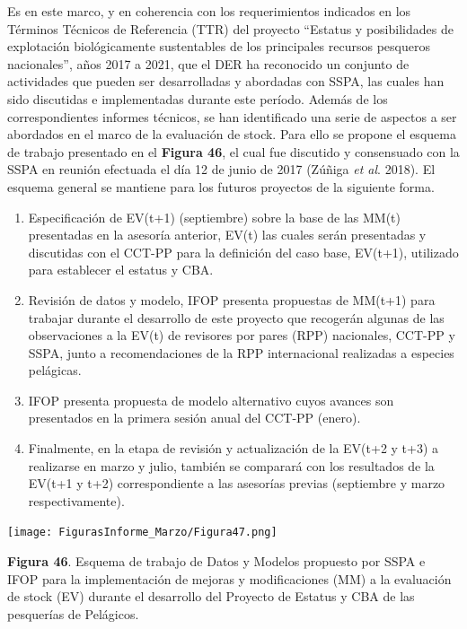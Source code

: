 \documentclass[
  spanish,
]{article}
\providecommand{\tightlist}{%
  \setlength{\itemsep}{0pt}\setlength{\parskip}{0pt}}
\begin{document}
Es en este marco, y en coherencia con los requerimientos indicados en
los Términos Técnicos de Referencia (TTR) del proyecto ``Estatus y
posibilidades de explotación biológicamente sustentables de los
principales recursos pesqueros nacionales'', años 2017 a 2021, que el
DER ha reconocido un conjunto de actividades que pueden ser
desarrolladas y abordadas con SSPA, las cuales han sido discutidas e
implementadas durante este período. Además de los correspondientes
informes técnicos, se han identificado una serie de aspectos a ser
abordados en el marco de la evaluación de stock. Para ello se propone el
esquema de trabajo presentado en el \textbf{Figura 46}, el cual fue
discutido y consensuado con la SSPA en reunión efectuada el día 12 de
junio de 2017 (Zúñiga \emph{et al}. 2018). El esquema general se
mantiene para los futuros proyectos de la siguiente forma.

\begin{enumerate}
\def\labelenumi{\roman{enumi})}
\tightlist
\item
  Especificación de EV(t+1) (septiembre) sobre la base de las MM(t)
  presentadas en la asesoría anterior, EV(t) las cuales serán
  presentadas y discutidas con el CCT-PP para la definición del caso
  base, EV(t+1), utilizado para establecer el estatus y CBA.
\item
  Revisión de datos y modelo, IFOP presenta propuestas de MM(t+1) para
  trabajar durante el desarrollo de este proyecto que recogerán algunas
  de las observaciones a la EV(t) de revisores por pares (RPP)
  nacionales, CCT-PP y SSPA, junto a recomendaciones de la RPP
  internacional realizadas a especies pelágicas.
\item
  IFOP presenta propuesta de modelo alternativo cuyos avances son
  presentados en la primera sesión anual del CCT-PP (enero).
\item
  Finalmente, en la etapa de revisión y actualización de la EV(t+2 y
  t+3) a realizarse en marzo y julio, también se comparará con los
  resultados de la EV(t+1 y t+2) correspondiente a las asesorías previas
  (septiembre y marzo respectivamente).
\end{enumerate}

\begin{center}
\texttt{[image: FigurasInforme\_Marzo/Figura47.png]}
\end{center}

\small

\textbf{Figura 46}. Esquema de trabajo de Datos y Modelos propuesto por
SSPA e IFOP para la implementación de mejoras y modificaciones (MM) a la
evaluación de stock (EV) durante el desarrollo del Proyecto de Estatus y
CBA de las pesquerías de Pelágicos. \vspace{0.5cm} \normalsize
\end{document}
